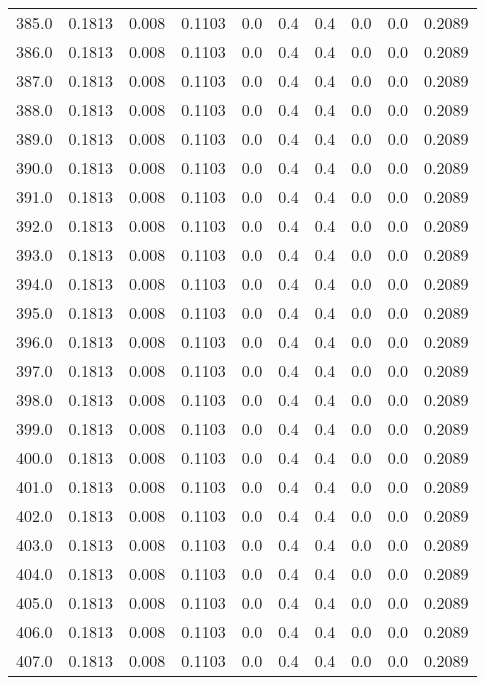 \begin{longtable}{lrrrrrrrrr}
385.0 & 0.1813 & 0.008 & 0.1103 & 0.0 & 0.4 & 0.4 & 0.0 & 0.0 & 0.2089 \\
386.0 & 0.1813 & 0.008 & 0.1103 & 0.0 & 0.4 & 0.4 & 0.0 & 0.0 & 0.2089 \\
387.0 & 0.1813 & 0.008 & 0.1103 & 0.0 & 0.4 & 0.4 & 0.0 & 0.0 & 0.2089 \\
388.0 & 0.1813 & 0.008 & 0.1103 & 0.0 & 0.4 & 0.4 & 0.0 & 0.0 & 0.2089 \\
389.0 & 0.1813 & 0.008 & 0.1103 & 0.0 & 0.4 & 0.4 & 0.0 & 0.0 & 0.2089 \\
390.0 & 0.1813 & 0.008 & 0.1103 & 0.0 & 0.4 & 0.4 & 0.0 & 0.0 & 0.2089 \\
391.0 & 0.1813 & 0.008 & 0.1103 & 0.0 & 0.4 & 0.4 & 0.0 & 0.0 & 0.2089 \\
392.0 & 0.1813 & 0.008 & 0.1103 & 0.0 & 0.4 & 0.4 & 0.0 & 0.0 & 0.2089 \\
393.0 & 0.1813 & 0.008 & 0.1103 & 0.0 & 0.4 & 0.4 & 0.0 & 0.0 & 0.2089 \\
394.0 & 0.1813 & 0.008 & 0.1103 & 0.0 & 0.4 & 0.4 & 0.0 & 0.0 & 0.2089 \\
395.0 & 0.1813 & 0.008 & 0.1103 & 0.0 & 0.4 & 0.4 & 0.0 & 0.0 & 0.2089 \\
396.0 & 0.1813 & 0.008 & 0.1103 & 0.0 & 0.4 & 0.4 & 0.0 & 0.0 & 0.2089 \\
397.0 & 0.1813 & 0.008 & 0.1103 & 0.0 & 0.4 & 0.4 & 0.0 & 0.0 & 0.2089 \\
398.0 & 0.1813 & 0.008 & 0.1103 & 0.0 & 0.4 & 0.4 & 0.0 & 0.0 & 0.2089 \\
399.0 & 0.1813 & 0.008 & 0.1103 & 0.0 & 0.4 & 0.4 & 0.0 & 0.0 & 0.2089 \\
400.0 & 0.1813 & 0.008 & 0.1103 & 0.0 & 0.4 & 0.4 & 0.0 & 0.0 & 0.2089 \\
401.0 & 0.1813 & 0.008 & 0.1103 & 0.0 & 0.4 & 0.4 & 0.0 & 0.0 & 0.2089 \\
402.0 & 0.1813 & 0.008 & 0.1103 & 0.0 & 0.4 & 0.4 & 0.0 & 0.0 & 0.2089 \\
403.0 & 0.1813 & 0.008 & 0.1103 & 0.0 & 0.4 & 0.4 & 0.0 & 0.0 & 0.2089 \\
404.0 & 0.1813 & 0.008 & 0.1103 & 0.0 & 0.4 & 0.4 & 0.0 & 0.0 & 0.2089 \\
405.0 & 0.1813 & 0.008 & 0.1103 & 0.0 & 0.4 & 0.4 & 0.0 & 0.0 & 0.2089 \\
406.0 & 0.1813 & 0.008 & 0.1103 & 0.0 & 0.4 & 0.4 & 0.0 & 0.0 & 0.2089 \\
407.0 & 0.1813 & 0.008 & 0.1103 & 0.0 & 0.4 & 0.4 & 0.0 & 0.0 & 0.2089 \\

\end{longtable}
